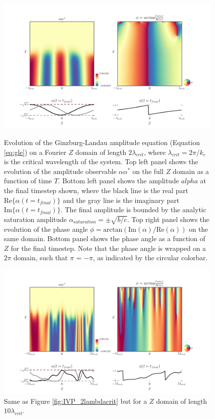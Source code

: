 \documentclass{emulateapj}
\begin{document}
\begin{figure}[h!]
\centering
\includegraphics[width=\textwidth]{../figures/IVP_plot_thingap_AA_phase_2lambdacrit_2.png}%
\caption{Evolution of the Ginzburg-Landau amplitude equation (Equation \ref{eq:gle}) on a Fourier $Z$ domain of length $2 \lambda_{crit}$, where $\lambda_{crit} = 2\pi/k_c$ is the critical wavelength of the system. Top left panel shows the evolution of the amplitude observable $\alpha \alpha^*$ on the full $Z$ domain as a function of time $T$. Bottom left panel shows the amplitude $alpha$ at the final timestep shown, where the black line is the real part $\mathrm{Re}\{\alpha(t = t_{final})\}$ and the gray line is the imaginary part $\mathrm{Im}\{\alpha(t = t_{final})\}$. The final amplitude is bounded by the analytic saturation amplitude $\alpha_{saturation} = \pm \sqrt{b/c}$. Top right panel shows the evolution of the phase angle $\phi = \mathrm{arctan} (\mathrm{Im}(\alpha)/\mathrm{Re}(\alpha))$ on the same domain. Bottom panel shows the phase angle as a function of $Z$ for the final timestep. Note that the phase angle is wrapped on a $2\pi$ domain, such that $\pi$ = $-\pi$, as indicated by the circular colorbar.}\label{fig:IVP_2lambdacrit}

\centering
\includegraphics[width=\textwidth]{../figures/IVP_plot_thingap_AA_phase_2lambdacrit_10.png}%
\caption{Same as Figure \ref{fig:IVP_2lambdacrit} but for a $Z$ domain of length $10 \lambda_{crit}$.}\label{fig:IVP_10lambdacrit}
\end{figure}
\end{document}

